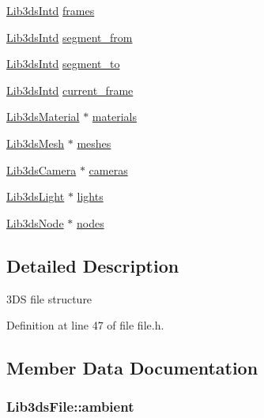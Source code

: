 \begin{DoxyCompactItemize}
\item 
\hyperlink{types_8h_a5d92ad41149cf040ce2ee32cc2609403}{Lib3ds\-Intd} \hyperlink{struct_lib3ds_file_a4bced0c9ca91104ff61849d99100dbaa}{frames}
\item 
\hyperlink{types_8h_a5d92ad41149cf040ce2ee32cc2609403}{Lib3ds\-Intd} \hyperlink{struct_lib3ds_file_ad76a7b0a44ca2100a10e18ef190c885e}{segment\-\_\-from}
\item 
\hyperlink{types_8h_a5d92ad41149cf040ce2ee32cc2609403}{Lib3ds\-Intd} \hyperlink{struct_lib3ds_file_a5f30923e3fbf000a2782d028d810805c}{segment\-\_\-to}
\item 
\hyperlink{types_8h_a5d92ad41149cf040ce2ee32cc2609403}{Lib3ds\-Intd} \hyperlink{struct_lib3ds_file_adb930fa64f56ff646526e989fe55308f}{current\-\_\-frame}
\item 
\hyperlink{struct_lib3ds_material}{Lib3ds\-Material} $\ast$ \hyperlink{struct_lib3ds_file_a8099e11a22ef8100f4089339bb9a4e08}{materials}
\item 
\hyperlink{struct_lib3ds_mesh}{Lib3ds\-Mesh} $\ast$ \hyperlink{struct_lib3ds_file_a8502d0749e304185f7ff283d1f7e99cc}{meshes}
\item 
\hyperlink{struct_lib3ds_camera}{Lib3ds\-Camera} $\ast$ \hyperlink{struct_lib3ds_file_abca35d2771d9ea1dd3eac7feb212651b}{cameras}
\item 
\hyperlink{struct_lib3ds_light}{Lib3ds\-Light} $\ast$ \hyperlink{struct_lib3ds_file_a0dc58035635838a5075a6257c8bc6a3e}{lights}
\item 
\hyperlink{struct_lib3ds_node}{Lib3ds\-Node} $\ast$ \hyperlink{struct_lib3ds_file_a78196fa94943379542c94c034fef5398}{nodes}
\end{DoxyCompactItemize}


\subsection{Detailed Description}
3\-D\-S file structure 

Definition at line 47 of file file.\-h.



\subsection{Member Data Documentation}
\hypertarget{struct_lib3ds_file_a72cc1f3e87f252a8bdbceb9b7204ec31}{
\subsubsection[{ambient}]{ Lib3ds\-File\-::ambient}}\label{struct_lib3ds_file_a72cc1f3e87f252a8bdbceb9b7204ec31}


